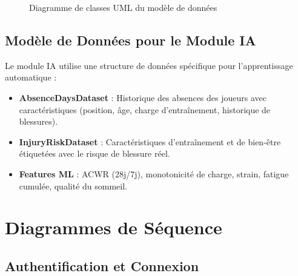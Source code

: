 \begin{figure}[H]
\begin{tikzpicture}[
    cls/.style={rectangle, draw, minimum width=5cm, minimum height=0.5cm, text width=4.8cm, font=\small},
    relationship/.style={-latex, thick}
]
\end{tikzpicture}
\caption{Diagramme de classes UML du modèle de données}
\label{fig:class-diagram}
\end{figure}

\subsection{Modèle de Données pour le Module IA}

Le module IA utilise une structure de données spécifique pour l'apprentissage automatique :

\begin{itemize}
    \item \textbf{AbsenceDaysDataset} : Historique des absences des joueurs avec caractéristiques (position, âge, charge d'entraînement, historique de blessures).
    \item \textbf{InjuryRiskDataset} : Caractéristiques d'entraînement et de bien-être étiquetées avec le risque de blessure réel.
    \item \textbf{Features ML} : ACWR (28j/7j), monotonicité de charge, strain, fatigue cumulée, qualité du sommeil.
\end{itemize}

\section{Diagrammes de Séquence}

\subsection{Authentification et Connexion}

